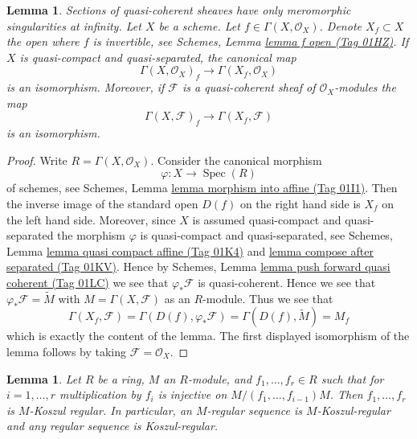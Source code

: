 \documentclass{amsart}
\newenvironment{slogan}{\comment}{\endcomment}
\theoremstyle{plain}
\newtheorem{lemma}[subsection]{Lemma}
\theoremstyle{definition}
\theoremstyle{remark}
\numberwithin{equation}{subsection}
\def\Spec{\mathop{\mathrm{Spec}}}
\begin{document}
\begin{lemma}
\label{properties-lemma-invert-f-sections}
\begin{slogan}
Sections of quasi-coherent sheaves have only meromorphic singularities
at infinity.
\end{slogan}
Let $X$ be a scheme. Let $f \in \Gamma(X, \mathcal{O}_X)$.
Denote $X_f \subset X$ the open where $f$ is invertible, see
Schemes, Lemma \href{https://stacks.math.columbia.edu/tag/01HZ}{lemma f open (Tag 01HZ)}.
If $X$ is quasi-compact and quasi-separated, the canonical map
$$
\Gamma(X, \mathcal{O}_X)_f \longrightarrow \Gamma(X_f, \mathcal{O}_X)
$$
is an isomorphism. Moreover, if $\mathcal{F}$ is a quasi-coherent
sheaf of $\mathcal{O}_X$-modules the map
$$
\Gamma(X, \mathcal{F})_f \longrightarrow \Gamma(X_f, \mathcal{F})
$$
is an isomorphism.
\end{lemma}

\begin{proof}
Write $R = \Gamma(X, \mathcal{O}_X)$. Consider the canonical morphism
$$
\varphi : X \longrightarrow \Spec(R)
$$
of schemes, see
Schemes, Lemma
\href{https://stacks.math.columbia.edu/tag/01I1}{lemma morphism into affine (Tag 01I1)}.
Then the inverse image of the standard open $D(f)$ on the
right hand side is $X_f$ on the left hand side.
Moreover, since $X$ is assumed quasi-compact and quasi-separated
the morphism $\varphi$ is quasi-compact and quasi-separated,
see Schemes, Lemma \href{https://stacks.math.columbia.edu/tag/01K4}{lemma quasi compact affine (Tag 01K4)} and
\href{https://stacks.math.columbia.edu/tag/01KV}{lemma compose after separated (Tag 01KV)}. Hence by
Schemes, Lemma \href{https://stacks.math.columbia.edu/tag/01LC}{lemma push forward quasi coherent (Tag 01LC)}
we see that $\varphi_*\mathcal{F}$ is quasi-coherent.
Hence we see that $\varphi_*\mathcal{F} = \widetilde M$
with $M = \Gamma(X, \mathcal{F})$ as an $R$-module.
Thus we see that
$$
\Gamma(X_f, \mathcal{F}) =
\Gamma(D(f), \varphi_*\mathcal{F}) =
\Gamma(D(f), \widetilde M) = M_f
$$
which is exactly the content of the lemma. The first displayed isomorphism
of the lemma follows by taking $\mathcal{F} = \mathcal{O}_X$.
\end{proof}


\begin{lemma}
\label{more-algebra-lemma-regular-koszul-regular}
Let $R$ be a ring, $M$ an $R$-module, and $f_1, \ldots, f_r \in R$
such that for $i = 1, \ldots, r$ multiplication by $f_i$
is injective on $M/(f_1, \ldots, f_{i - 1})M$. Then $f_1, \ldots, f_r$
is $M$-Koszul regular. In particular, an $M$-regular sequence
is $M$-Koszul-regular and any regular sequence is Koszul-regular.
\end{lemma}
\end{document}

